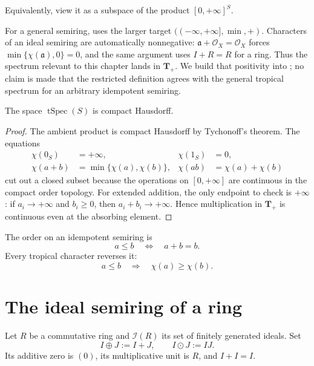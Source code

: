 Equivalently, view it as a subspace of the product
$[0,+\infty]^S$.

\begin{remark}
\label{rem:ts-positive-target}
For a general semiring, \cite[Definition~1.2.1]{MP24} uses the larger
target $((-\infty,+\infty],\min,+)$.  Characters of an ideal semiring are
automatically nonnegative: $\mathfrak a+\mathcal O_X=\mathcal O_X$
forces $\min\{\chi(\mathfrak a),0\}=0$, and the same argument
uses $I+R=R$ for a ring. Thus the spectrum relevant to this chapter lands
in $\mathbf T_+$.  We build that positivity into
; no claim is made that the restricted
definition agrees with the general tropical spectrum for an arbitrary
idempotent semiring.
\end{remark}

\begin{proposition}\label{prop:ts-compact}
The space $\operatorname{tSpec}(S)$ is compact Hausdorff.
\end{proposition}

\begin{proof}
The ambient product is compact Hausdorff by Tychonoff's theorem.
The equations
\[
\begin{aligned}
 \chi(0_S)&=+\infty,&
 \chi(1_S)&=0,\\
 \chi(a+b)&=\min\{\chi(a),\chi(b)\},&
 \chi(ab)&=\chi(a)+\chi(b)
\end{aligned}
\]
cut out a closed subset because the operations on
$[0,+\infty]$ are continuous in the compact order topology.
For extended addition, the only endpoint to check is $+\infty$: if
$a_i\to+\infty$ and $b_i\geq0$, then
$a_i+b_i\to+\infty$.  Hence multiplication in $\mathbf T_+$ is
continuous even at the absorbing element.
\end{proof}

The order on an idempotent semiring is
\[
                         a\leq b\quad\Longleftrightarrow\quad a+b=b.
\]
Every tropical character reverses it:
\[
                a\leq b\quad\Longrightarrow\quad\chi(a)\geq\chi(b).
\tag{58.3}\label{eq:ts-order-reversal}
\]

\section{The ideal semiring of a ring}
\label{sec:ts-affine}

Let $R$ be a commutative ring and
$\mathscr I(R)$ its set of finitely generated ideals.
Set
\[
             I\oplus J:=I+J,\qquad I\odot J:=IJ.
\tag{58.4}\label{eq:ts-ideal-operations}
\]
Its additive zero is $(0)$, its multiplicative unit is $R$, and
$I+I=I$.

